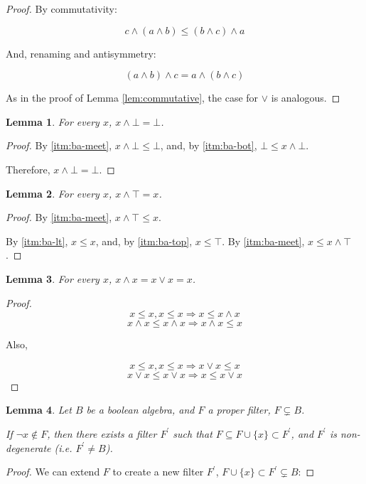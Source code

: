 \documentclass[notitlepage,a4paper]{article}
\newtheorem{lemma}{Lemma}
\begin{document}
\begin{enumerate}
\begin{proof}
       By commutativity:

       $$c ∧ (a ∧ b) ≤ (b ∧ c) ∧ a$$

       And, renaming and antisymmetry:

       $$(a ∧ b) ∧ c = a ∧ (b ∧ c)$$

       As in the proof of Lemma \ref{lem:commutative}, the case for $∨$ is
       analogous.
       
     \end{proof}

     \begin{lemma}\label{lem:bot-meet}
       For every $x$, $x ∧ ⊥ = ⊥$.
     \end{lemma}
     \begin{proof}
       By \ref{itm:ba-meet}, $x ∧ ⊥ ≤ ⊥$, and,
       by \ref{itm:ba-bot}, $⊥ ≤ x ∧ ⊥$.

       Therefore, $x ∧ ⊥ = ⊥$.
     \end{proof}

     \begin{lemma}\label{lem:top-meet}
       For every $x$, $x ∧ ⊤ = x$.
     \end{lemma}
     \begin{proof}
       By \ref{itm:ba-meet}, $x ∧ ⊤ ≤ x$.

       By \ref{itm:ba-lt}, $x ≤ x$, and, by \ref{itm:ba-top}, $x ≤ ⊤$.
       By \ref{itm:ba-meet}, $x ≤ x ∧ ⊤$.
     \end{proof}
     
     \begin{lemma}\label{lem:self}
       For every $x$, $x ∧ x = x ∨ x = x$.
     \end{lemma}
     \begin{proof}
       $$ x ≤ x, x ≤ x ⇒ x ≤ x ∧ x$$
       $$ x ∧ x ≤ x ∧ x ⇒ x ∧ x ≤ x$$

       Also,

       $$ x ≤ x, x ≤ x ⇒ x ∨ x ≤ x$$
       $$ x ∨ x ≤ x ∨ x ⇒ x ≤ x ∨ x$$
     \end{proof}

     \begin{lemma}\label{lem:filter-ext}
       Let $B$ be a boolean algebra, and $F$ a proper filter, $F \subsetneq B$.
       
       If $¬x \not \in F$, then there exists a
       filter $F^\prime$ such that $F \subseteq F \cup \{x\} \subset F^\prime$,
       and $F^\prime$ is non-degenerate (i.e. $F^\prime \neq B$).
       
    \end{lemma}
    \begin{proof}
           We can extend $F$ to create a new filter $F^\prime$,
           $F \cup \{x\} \subset F^\prime \subsetneq B$:
           

\end{proof}
\end{enumerate}
\end{document}
